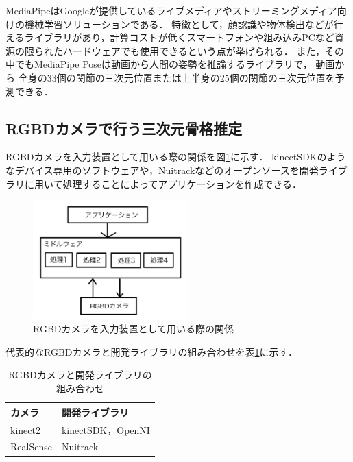 \documentclass[titlepage]{jarticle}
\begin{document}
MediaPipeはGoogleが提供しているライブメディアやストリーミングメディア向けの機械学習ソリューションである．
特徴として，顔認識や物体検出などが行えるライブラリがあり，計算コストが低くスマートフォンや組み込みPCなど資源の限られたハードウェアでも使用できるという点が挙げられる．%
また，その中でもMediaPipe Poseは動画から人間の姿勢を推論するライブラリで，
動画から
全身の33個の関節の三次元位置または上半身の25個の関節の三次元位置を予測できる．


\subsection{RGBDカメラで行う三次元骨格推定}
RGBDカメラを入力装置として用いる際の関係を図\ref{app}に示す．
kinectSDK\cite{kinectSDK}のようなデバイス専用のソフトウェアや，Nuitrack\cite{nuitrack}などのオープンソースを開発ライブラリに用いて処理することによってアプリケーションを作成できる．

\begin{figure}[t!]
  \centering
  \includegraphics[width=6cm]{img/app3.jpg}
  \caption{RGBDカメラを入力装置として用いる際の関係}
  \label{app}
\end{figure}

代表的なRGBDカメラと開発ライブラリの組み合わせを表\ref{RGBD}に示す．

\begin{table}[t!]
  \centering
  \caption{RGBDカメラと開発ライブラリの組み合わせ}
  \begin{tabular}{l|l}\hline
    カメラ       & 開発ライブラリ          \\\hline
    kinect2   & kinectSDK，OpenNI \\
    RealSense & Nuitrack         \\\hline
  \end{tabular}
  \label{RGBD}
\end{table}
\end{document}
